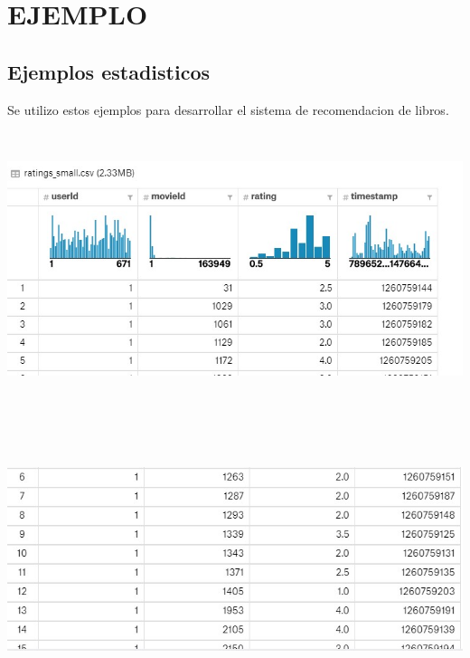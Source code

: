 \section{EJEMPLO} 



\subsection{Ejemplos estadisticos}
	
Se utilizo estos ejemplos para desarrollar el sistema de recomendacion de libros.


\begin{center}
\includegraphics[width=18cm, height=8cm]{./Imagenes/img1.jpg}
\end{center}


\begin{center}
\includegraphics[width=18cm, height=8cm]{./Imagenes/img2.jpg}
\end{center}


\begin{center}

\end{center}


